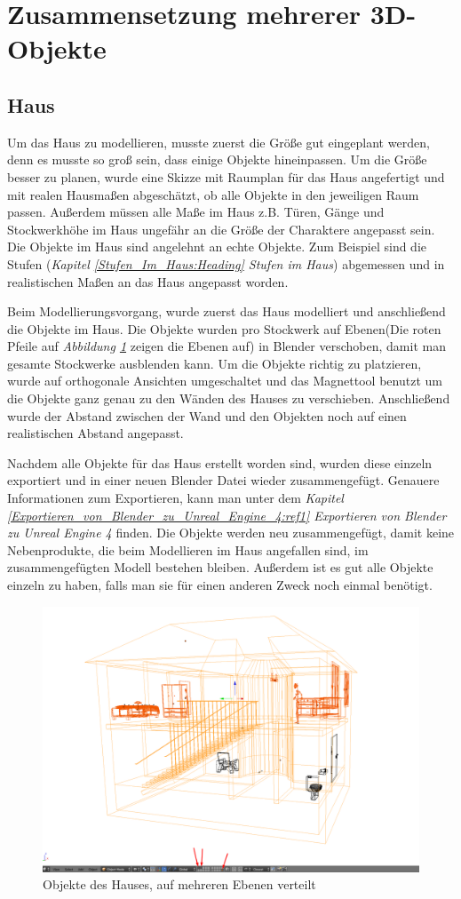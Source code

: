 \section{Zusammensetzung mehrerer 3D-Objekte}
\subsection{Haus}
\label{haus:ref1}
Um das Haus zu modellieren, musste zuerst die Größe gut eingeplant werden, denn es musste so groß sein, dass einige Objekte hineinpassen.
Um die Größe besser zu planen, wurde eine Skizze mit Raumplan für das Haus angefertigt und mit realen Hausmaßen abgeschätzt, ob alle Objekte in den jeweiligen Raum passen.
Außerdem müssen alle Maße im Haus z.B. Türen, Gänge und Stockwerkhöhe im Haus ungefähr an die Größe der Charaktere angepasst sein.
Die Objekte im Haus sind angelehnt an echte Objekte. Zum Beispiel sind die Stufen (\textit{Kapitel \ref{Stufen_Im_Haus:Heading} \dq Stufen im Haus\dq})
abgemessen und in realistischen Maßen an das Haus angepasst worden.

Beim Modellierungsvorgang, wurde zuerst das Haus modelliert und anschließend die Objekte im Haus. Die Objekte wurden pro Stockwerk auf Ebenen(Die roten Pfeile auf \textit{Abbildung \ref{Haus:image1}} zeigen
die Ebenen auf) in Blender verschoben, damit man gesamte Stockwerke ausblenden kann. Um die Objekte richtig zu platzieren, wurde auf orthogonale Ansichten umgeschaltet
und das Magnettool benutzt um die Objekte ganz genau zu den Wänden des Hauses zu verschieben. Anschließend wurde der Abstand zwischen der Wand und den Objekten
noch auf einen realistischen Abstand angepasst.

Nachdem alle Objekte für das Haus erstellt worden sind, wurden diese einzeln exportiert und in einer neuen Blender Datei wieder zusammengefügt. Genauere Informationen zum Exportieren, kann
man unter dem \textit{Kapitel \ref{Exportieren_von_Blender_zu_Unreal_Engine_4:ref1} \dq Exportieren von Blender zu Unreal Engine 4\dq} finden. Die Objekte werden neu zusammengefügt, damit keine Nebenprodukte, die beim Modellieren
im Haus angefallen sind, im zusammengefügten Modell bestehen bleiben. Außerdem ist es gut alle Objekte einzeln zu haben, falls man sie für einen anderen Zweck noch einmal benötigt.

\begin{figure}[h]
    \centering
    \includegraphics[width=.8\textwidth]{images/Haus-zusammenfuegen_Ebenen.png}
    \caption{Objekte des Hauses, auf mehreren Ebenen verteilt}
    \label{Haus:image1}
\end{figure}